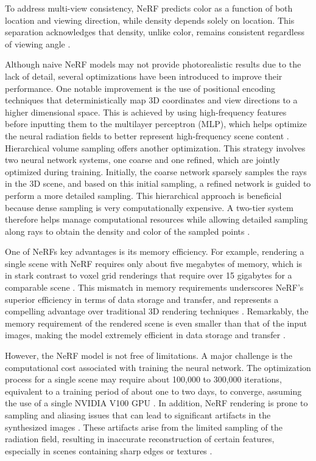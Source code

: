 To address multi-view consistency, NeRF predicts color as a function of both location and viewing direction, while density depends solely on location. This separation acknowledges that density, unlike color, remains consistent regardless of viewing angle \citep{hu2023consistentnerf}. 

Although naive NeRF models may not provide photorealistic results due to the lack of detail, several optimizations have been introduced to improve their performance. One notable improvement is the use of positional encoding techniques that deterministically map 3D coordinates and view directions to a higher dimensional space. This is achieved by using high-frequency features before inputting them to the multilayer perceptron (MLP), which helps optimize the neural radiation fields to better represent high-frequency scene content \citep{mildenhallNERF}. Hierarchical volume sampling offers another optimization. This strategy involves two neural network systems, one coarse and one refined, which are jointly optimized during training. Initially, the coarse network sparsely samples the rays in the 3D scene, and based on this initial sampling, a refined network is guided to perform a more detailed sampling. This hierarchical approach is beneficial because dense sampling is very computationally expensive. A two-tier system therefore helps manage computational resources while allowing detailed sampling along rays to obtain the density and color of the sampled points \citep{arandjelović2021nerf}.

One of NeRFs key advantages is its memory efficiency. For example, rendering a single scene with NeRF requires only about five megabytes of memory, which is in stark contrast to voxel grid renderings that require over 15 gigabytes for a comparable scene \citep{mildenhallNERF}. This mismatch in memory requirements underscores NeRF's superior efficiency in terms of data storage and transfer, and represents a compelling advantage over traditional 3D rendering techniques \citep{mildenhallNERF}. Remarkably, the memory requirement of the rendered scene is even smaller than that of the input images, making the model extremely efficient in data storage and transfer \citep{mildenhallNERF}.

However, the NeRF model is not free of limitations. A major challenge is the computational cost associated with training the neural network. The optimization process for a single scene may require about 100,000 to 300,000 iterations, equivalent to a training period of about one to two days, to converge, assuming the use of a single NVIDIA V100 GPU \citep{mildenhallNERF}. In addition, NeRF rendering is prone to sampling and aliasing issues that can lead to significant artifacts in the synthesized images \citep{rabby2023beyondpixels}. These artifacts arise from the limited sampling of the radiation field, resulting in inaccurate reconstruction of certain features, especially in scenes containing sharp edges or textures \citep{rabby2023beyondpixels}.